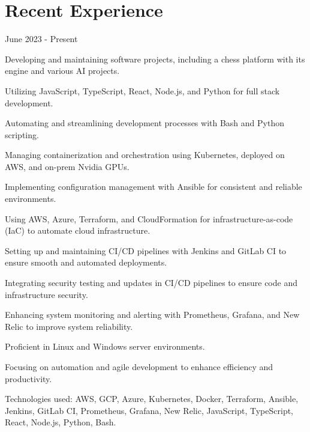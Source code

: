 \section{Recent Experience}

 {June 2023 - Present}
\begin{resume_list}
    \item Developing and maintaining software projects, including a chess platform with its engine and various AI projects.
    \item Utilizing JavaScript, TypeScript, React, Node.js, and Python for full stack development.
    \item Automating and streamlining development processes with Bash and Python scripting.
    \item Managing containerization and orchestration using Kubernetes, deployed on AWS, and on-prem Nvidia GPUs.
    \item Implementing configuration management with Ansible for consistent and reliable environments.
    \item Using AWS, Azure, Terraform, and CloudFormation for infrastructure-as-code (IaC) to automate cloud infrastructure.
    \item Setting up and maintaining CI/CD pipelines with Jenkins and GitLab CI to ensure smooth and automated deployments.
    \item Integrating security testing and updates in CI/CD pipelines to ensure code and infrastructure security.
    \item Enhancing system monitoring and alerting with Prometheus, Grafana, and New Relic to improve system reliability.
    \item Proficient in Linux and Windows server environments.
    \item Focusing on automation and agile development to enhance efficiency and productivity.
    \item Technologies used: AWS, GCP, Azure, Kubernetes, Docker, Terraform, Ansible, Jenkins, GitLab CI, Prometheus, Grafana, New Relic, JavaScript, TypeScript, React, Node.js, Python, Bash.
\end{resume_list}


